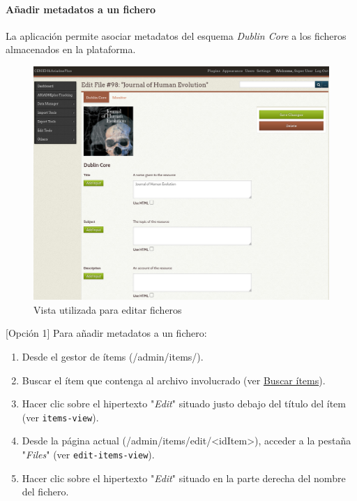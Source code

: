 \documentclass[
]{article}
\providecommand{\tightlist}{%
  \setlength{\itemsep}{0pt}\setlength{\parskip}{0pt}}
\begin{document}
\hypertarget{auxf1adir-metadatos-a-un-fichero}{%
\paragraph{Añadir metadatos a un
fichero}\label{auxf1adir-metadatos-a-un-fichero}}

La aplicación permite asociar metadatos del esquema \emph{Dublin Core} a
los ficheros almacenados en la plataforma.

\begin{figure}
\hypertarget{edit-files-view}{%
\centering
\includegraphics{../_static/images/edit-files-view.png}
\caption{Vista utilizada para editar ficheros}\label{edit-files-view}
}
\end{figure}

{[}Opción 1{]} Para añadir metadatos a un fichero:

\begin{enumerate}
\def\labelenumi{\arabic{enumi}.}
\tightlist
\item
  Desde el gestor de ítems ({/admin/items/}).
\item
  Buscar el ítem que contenga al archivo involucrado (ver
  \protect\hyperlink{buscar-uxedtems}{Buscar ítems}).
\item
  Hacer clic sobre el hipertexto "\emph{Edit}" situado justo debajo del
  título del ítem (ver \texttt{items-view}).
\item
  Desde la página actual
  ({/admin/items/edit/\textless idItem\textgreater{}}), acceder a la
  pestaña "\emph{Files}" (ver \texttt{edit-items-view}).
\item
  Hacer clic sobre el hipertexto "\emph{Edit}" situado en la parte
  derecha del nombre del fichero.
\end{enumerate}
\end{document}
